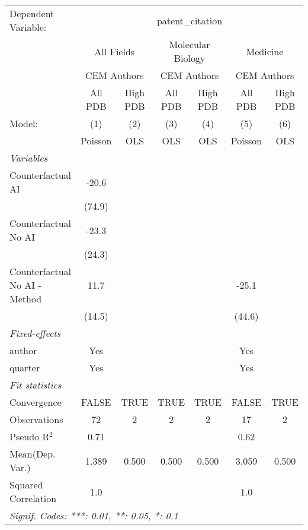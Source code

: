 \begingroup
\centering
\begin{tabular}{lcccccc}
   \tabularnewline \midrule \midrule
   Dependent Variable: & \multicolumn{6}{c}{patent\_citation}\\
 & \multicolumn{2}{c}{All Fields} & \multicolumn{2}{c}{Molecular Biology} & \multicolumn{2}{c}{Medicine} \\
\cmidrule(lr){2-3} \cmidrule(lr){4-5} \cmidrule(lr){6-7}
 & \multicolumn{2}{c}{CEM Authors} & \multicolumn{2}{c}{CEM Authors} & \multicolumn{2}{c}{CEM Authors} \\
\cmidrule(lr){2-3} \cmidrule(lr){4-5} \cmidrule(lr){6-7}
 & \multicolumn{1}{c}{All PDB} & \multicolumn{1}{c}{High PDB} & \multicolumn{1}{c}{All PDB} & \multicolumn{1}{c}{High PDB} & \multicolumn{1}{c}{All PDB} & \multicolumn{1}{c}{High PDB} \\
\cmidrule(lr){2-2} \cmidrule(lr){3-3} \cmidrule(lr){4-4} \cmidrule(lr){5-5} \cmidrule(lr){6-6} \cmidrule(lr){7-7}
   Model:                        & (1)      & (2)  & (3)  & (4)  & (5)     & (6)\\  
                                 &  Poisson & OLS  & OLS  & OLS  & Poisson & OLS\\  
   \midrule
   \emph{Variables}\\
   Counterfactual AI             & -20.6    &      &      &      &         &   \\   
                                 & (74.9)   &      &      &      &         &   \\   
   Counterfactual No AI          & -23.3    &      &      &      &         &   \\   
                                 & (24.3)   &      &      &      &         &   \\   
   Counterfactual No AI - Method & 11.7     &      &      &      & -25.1   &   \\   
                                 & (14.5)   &      &      &      & (44.6)  &   \\   
   \midrule
   \emph{Fixed-effects}\\
   author                        & Yes      &      &      &      & Yes     & \\  
   quarter                       & Yes      &      &      &      & Yes     & \\  
   \midrule
   \emph{Fit statistics}\\
   Convergence                   &FALSE     & TRUE & TRUE & TRUE & FALSE   & TRUE\\  
   Observations                  & 72       & 2    & 2    & 2    & 17      & 2\\  
   Pseudo R$^2$                  & 0.71     &      &      &      & 0.62    & \\  
Mean(Dep. Var.) & 1.389 & 0.500 & 0.500 & 0.500 & 3.059 & 0.500 \\
   Squared Correlation           & 1.0      &      &      &      & 1.0     & \\  
   \midrule \midrule
   \multicolumn{7}{l}{\emph{Signif. Codes: ***: 0.01, **: 0.05, *: 0.1}}\\
\end{tabular}
\par\endgroup
